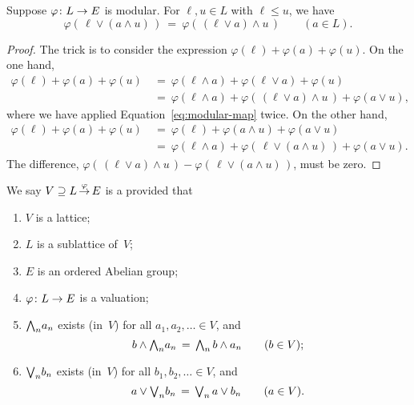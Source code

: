 \documentclass[main.tex]{subfiles}
\begin{document}
%
%
\begin{lem}
\label{L:modular-map-modular}
Suppose $\varphi\colon L \rightarrow E$ is modular.
For $\ell,u\in L$ with $\ell\leq u$, we have
\begin{equation}
\label{eq:modular-map}
\varphi(\,\ell \vee (a \wedge u)\,) 
\ =\ 
\varphi(\,(\ell\vee a)\wedge u\,)
\qquad (a\in L).
\end{equation}
\begin{proof}
The trick is to consider the expression 
$\varphi(\ell) + \varphi(a) + \varphi(u)$.
On the one hand,
\begin{align*}
\varphi(\ell) + \varphi(a) + \varphi(u)
\ &=\ \varphi(\ell\wedge a) + \varphi(\ell \vee a) + \varphi(u) \\
\ &=\ \varphi(\ell \wedge a)
      + \varphi(\,(\ell\vee a)\wedge u\,)
      + \varphi(a\vee u),
\end{align*}
where we have applied Equation~\eqref{eq:modular-map} twice.
On the other hand,
\begin{align*}
\varphi(\ell) + \varphi(a) + \varphi(u)
\ &=\ \varphi(\ell) + \varphi(a\wedge u) + \varphi(a \vee u) \\
\ &=\ \varphi(\ell \wedge a)
      + \varphi(\,\ell\vee (a\wedge u)\,)
      + \varphi(a\vee u).
\end{align*}
The difference,
$\varphi(\,(\ell\vee a)\wedge u\,)
- \varphi(\,\ell\vee (a\wedge u)\,)$,
must be zero.
\end{proof}
\end{lem}

%
%
\begin{dfn}
\label{D:system}
We say $V \supseteq L\,\smash{\stackrel{\varphi}{\rightarrow}}\,E$
 is a 
provided that
\begin{enumerate}
\item \label{D:system-1}
$V$ is a lattice;
\item \label{D:system-2}
$L$ is a sublattice of~$V$;
\item \label{D:system-3}
$E$ is an ordered Abelian group;
\item \label{D:system-4}
$\varphi\colon L\rightarrow E$ is a valuation;
\item \label{D:system-5}
$\textstyle{\bigwedge}_n a_n$ exists (in~$V$) for all $a_1, a_2, \dotsc\in V$,
and
\begin{equation*}
 b \wedge \textstyle{\bigwedge}_n a_n
\,=\,
\textstyle{\bigwedge}_n\, b\wedge a_n
\qquad(b\in V);
\end{equation*}

\item \label{D:system-6}
$\textstyle{\bigvee}_n b_n$ exists (in~$V$) for all $b_1, b_2,  \dotsc\in V$,
and 
\begin{equation*}
 a \vee \textstyle{\bigvee}_n b_n
\,=\,
\textstyle{\bigvee}_n\, a\vee b_n
\qquad(a\in V).
\end{equation*}
\end{enumerate}
\end{dfn}
\end{document}
